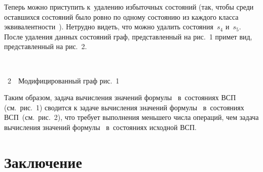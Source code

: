 \begin{multicols}{2}
Теперь можно приступить к~удалению избыточных состояний (так, чтобы
среди оставшихся состояний было ровно по одному состоянию
из каждого класса эквивалентности~).
Нетрудно видеть, что можно удалить состояния~$s_4$ и~$s_5$.
После удаления данных состояний граф, представленный
на рис.~1 примет вид, представленный на рис.~2.

\begin{center}  %
\vspace*{2pt}
\mbox{%
 \epsfxsize=40.06mm
 }
  \vspace*{2pt}

{{\figurename~2}\ \ \small{Модифицированный граф рис.~1}}
  \end{center}



\addtocounter{figure}{1}




Таким образом, задача вычисления
значений формулы~ в~состояниях ВСП (см.\ рис.~1)
сводится к задаче вычисления значений формулы~ в~состояниях
ВСП~(см.\ рис.~2), что требует выполнения
меньшего числа операций, чем задача вычисления
значений формулы~ в~состояниях исходной ВСП.

\vspace*{-9pt}


\section{Заключение}


\end{multicols}
